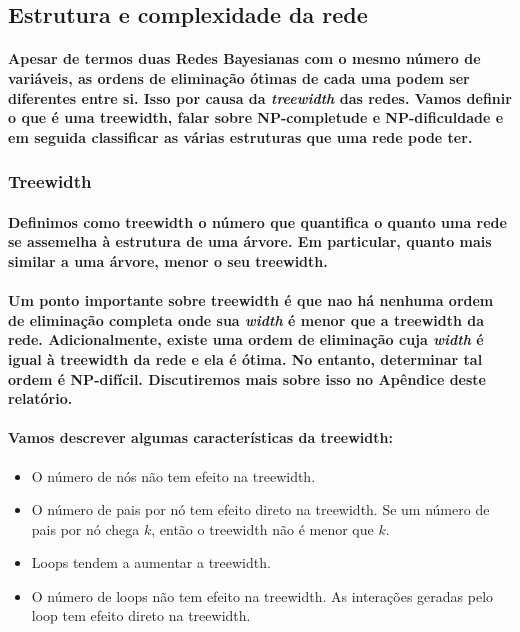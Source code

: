\documentclass[a4paper,10pt]{article}
\theoremstyle{plain}
\begin{document}
\subsection{Estrutura e complexidade da rede}

\paragraph{
  Apesar de termos duas Redes Bayesianas com o mesmo número de variáveis, as ordens de eliminação
  ótimas de cada uma podem ser diferentes entre si. Isso por causa da \textit{treewidth} das redes.
  Vamos definir o que é uma treewidth, falar sobre NP-completude e NP-dificuldade e em seguida
  classificar as várias estruturas que uma rede pode ter.
}

\subsubsection{Treewidth}

\paragraph{
  Definimos como treewidth o número que quantifica o quanto uma rede se assemelha à estrutura de
  uma árvore. Em particular, quanto mais similar a uma árvore, menor o seu treewidth.
}

\paragraph{
  Um ponto importante sobre treewidth é que nao há nenhuma ordem de eliminação completa onde sua
  \textit{width} é menor que a treewidth da rede. Adicionalmente, existe uma ordem de eliminação
  cuja \textit{width} é igual à treewidth da rede e ela é ótima. No entanto, determinar tal ordem é
  NP-difícil. Discutiremos mais sobre isso no Apêndice deste relatório.
}

\paragraph{
  Vamos descrever algumas características da treewidth:
}

\begin{itemize}
  \item O número de nós não tem efeito na treewidth.
  \item O número de pais por nó tem efeito direto na treewidth. Se um número de pais por nó chega
    $k$, então o treewidth não é menor que $k$.
  \item Loops tendem a aumentar a treewidth.
  \item O número de loops não tem efeito na treewidth. As interações geradas pelo loop tem efeito
    direto na treewidth.
\end{itemize}
\end{document}
